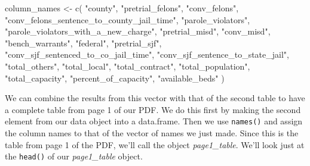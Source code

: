 \documentclass[
]{krantz}
\makeatletter
\newenvironment{Shaded}{\begin{snugshade}}{\end{snugshade}}
\newcommand{\FunctionTok}[1]{\textcolor[rgb]{0,0,0}{#1}}
\newcommand{\NormalTok}[1]{#1}
\newcommand{\OtherTok}[1]{\textcolor[rgb]{0.37,0.37,0.37}{#1}}
\newcommand{\StringTok}[1]{\textcolor[rgb]{0.5,0.5,0.5}{#1}}
\newenvironment{kframe}{%
\medskip{}
\setlength{\fboxsep}{.8em}
 \def\at@end@of@kframe{}%
 \ifinner\ifhmode%
  \def\at@end@of@kframe{\end{minipage}}%
  \begin{minipage}{\columnwidth}%
 \fi\fi%
 \def\FrameCommand##1{\hskip\@totalleftmargin \hskip-\fboxsep
 \colorbox{shadecolor}{##1}\hskip-\fboxsep
     \hskip-\linewidth \hskip-\@totalleftmargin \hskip\columnwidth}%
 \MakeFramed {\advance\hsize-\width
   \@totalleftmargin\z@ \linewidth\hsize
   \@setminipage}}%
 {\par\unskip\endMakeFramed%
 \at@end@of@kframe}
\renewenvironment{Shaded}{\begin{kframe}}{\end{kframe}}
\makeatother
\begin{document}
\begin{Shaded}
\begin{Highlighting}[]
\NormalTok{column\_names }\OtherTok{\textless{}{-}} \FunctionTok{c}\NormalTok{(}
  \StringTok{"county"}\NormalTok{,}
  \StringTok{"pretrial\_felons"}\NormalTok{,}
  \StringTok{"conv\_felons"}\NormalTok{,}
  \StringTok{"conv\_felons\_sentence\_to\_county\_jail\_time"}\NormalTok{,}
  \StringTok{"parole\_violators"}\NormalTok{,}
  \StringTok{"parole\_violators\_with\_a\_new\_charge"}\NormalTok{,}
  \StringTok{"pretrial\_misd"}\NormalTok{,}
  \StringTok{"conv\_misd"}\NormalTok{,}
  \StringTok{"bench\_warrants"}\NormalTok{,}
  \StringTok{"federal"}\NormalTok{,}
  \StringTok{"pretrial\_sjf"}\NormalTok{,}
  \StringTok{"conv\_sjf\_sentenced\_to\_co\_jail\_time"}\NormalTok{,}
  \StringTok{"conv\_sjf\_sentence\_to\_state\_jail"}\NormalTok{,}
  \StringTok{"total\_others"}\NormalTok{,}
  \StringTok{"total\_local"}\NormalTok{,}
  \StringTok{"total\_contract"}\NormalTok{,}
  \StringTok{"total\_population"}\NormalTok{,}
  \StringTok{"total\_capacity"}\NormalTok{,}
  \StringTok{"percent\_of\_capacity"}\NormalTok{,}
  \StringTok{"available\_beds"}
\NormalTok{)}
\end{Highlighting}
\end{Shaded}

We can combine the results from this vector with that of the
second table to have a complete table from page 1 of our
PDF. We do this first by making the second element from our
data object into a data.frame. Then we use \texttt{names()}
and assign the column names to that of the vector of names
we just made. Since this is the table from page 1 of the
PDF, we'll call the object \emph{page1\_table}. We'll look
just at the \texttt{head()} of our \emph{page1\_table}
object.
\end{document}

